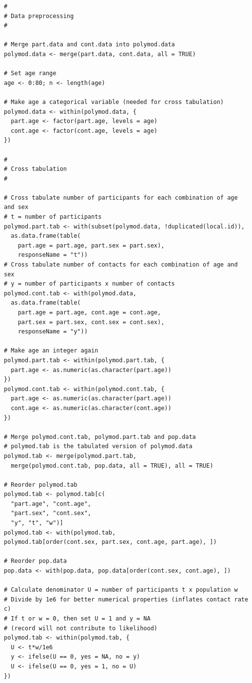 \documentclass[aoas,preprint]{imsart}
\numberwithin{equation}{section}
\begin{document}
\begin{verbatim}
#
# Data preprocessing
#

# Merge part.data and cont.data into polymod.data
polymod.data <- merge(part.data, cont.data, all = TRUE)

# Set age range
age <- 0:80; n <- length(age)

# Make age a categorical variable (needed for cross tabulation)
polymod.data <- within(polymod.data, {
  part.age <- factor(part.age, levels = age)
  cont.age <- factor(cont.age, levels = age)
})

#
# Cross tabulation
#

# Cross tabulate number of participants for each combination of age and sex
# t = number of participants
polymod.part.tab <- with(subset(polymod.data, !duplicated(local.id)),
  as.data.frame(table(
    part.age = part.age, part.sex = part.sex),
    responseName = "t"))
# Cross tabulate number of contacts for each combination of age and sex
# y = number of participants x number of contacts
polymod.cont.tab <- with(polymod.data,
  as.data.frame(table(
    part.age = part.age, cont.age = cont.age,
    part.sex = part.sex, cont.sex = cont.sex),
    responseName = "y"))

# Make age an integer again
polymod.part.tab <- within(polymod.part.tab, {
  part.age <- as.numeric(as.character(part.age))
})
polymod.cont.tab <- within(polymod.cont.tab, {
  part.age <- as.numeric(as.character(part.age))
  cont.age <- as.numeric(as.character(cont.age))
})

# Merge polymod.cont.tab, polymod.part.tab and pop.data
# polymod.tab is the tabulated version of polymod.data
polymod.tab <- merge(polymod.part.tab,
  merge(polymod.cont.tab, pop.data, all = TRUE), all = TRUE)

# Reorder polymod.tab
polymod.tab <- polymod.tab[c(
  "part.age", "cont.age",
  "part.sex", "cont.sex",
  "y", "t", "w")]
polymod.tab <- with(polymod.tab,
polymod.tab[order(cont.sex, part.sex, cont.age, part.age), ])

# Reorder pop.data
pop.data <- with(pop.data, pop.data[order(cont.sex, cont.age), ])

# Calculate denominator U = number of participants t x population w
# Divide by 1e6 for better numerical properties (inflates contact rate c)
# If t or w = 0, then set U = 1 and y = NA
# (record will not contribute to likelihood)
polymod.tab <- within(polymod.tab, {
  U <- t*w/1e6
  y <- ifelse(U == 0, yes = NA, no = y)
  U <- ifelse(U == 0, yes = 1, no = U)
})
\end{verbatim}
\end{document}
